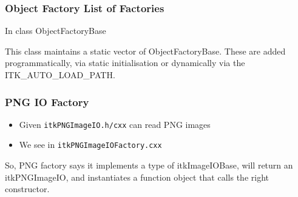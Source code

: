 \subsubsection{Object Factory List of
Factories}\label{object-factory-list-of-factories}

In class ObjectFactoryBase

\begin{Shaded}
\begin{Highlighting}[]
   
\NormalTok{\{}
\NormalTok{:}
   
\end{Highlighting}
\end{Shaded}

This class maintains a static vector of ObjectFactoryBase. These are
added programmatically, via static initialisation or dynamically via the
ITK\_AUTO\_LOAD\_PATH.

\subsubsection{PNG IO Factory}\label{png-io-factory}

\begin{itemize}
\itemsep1pt\parskip0pt
\item
  Given \texttt{itkPNGImageIO.h/cxx} can read PNG images
\item
  We see in \texttt{itkPNGImageIOFactory.cxx}
\end{itemize}

\begin{Shaded}
\begin{Highlighting}[]
\NormalTok{\{}
  \NormalTok{,}
                          \NormalTok{,}
                          \NormalTok{,}
                          \NormalTok{,}
\NormalTok{\}}
\end{Highlighting}
\end{Shaded}

So, PNG factory says it implements a type of itkImageIOBase, will return
an itkPNGImageIO, and instantiates a function object that calls the
right constructor.

